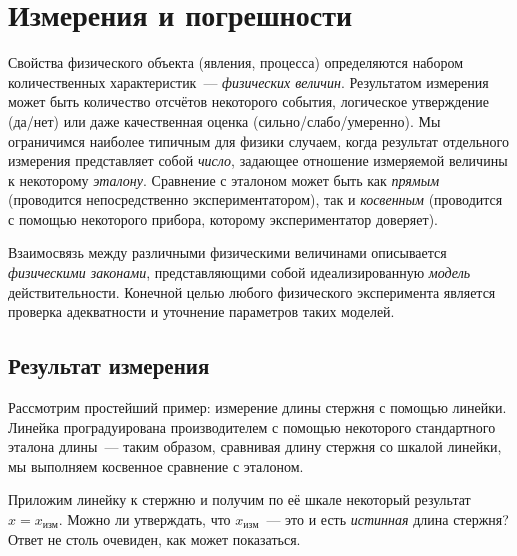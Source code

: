 \chapter{Измерения и погрешности}


Свойства физического объекта (явления, процесса) определяются набором
количественных характеристик~--- \emph{физических величин}.
Результатом измерения может быть количество отсчётов некоторого события, логическое утверждение (да/нет) или даже качественная оценка (сильно/слабо/умеренно). 
Мы ограничимся наиболее типичным для физики случаем, когда результат отдельного измерения представляет собой \emph{число}, задающее отношение измеряемой величины к некоторому \emph{эталону}.
Сравнение с эталоном может быть как \emph{прямым} (проводится непосредственно экспериментатором), так и \emph{косвенным} (проводится с помощью некоторого прибора, которому экспериментатор доверяет).

Взаимосвязь между различными физическими величинами описывается
\emph{физическими законами}, представляющими собой идеализированную
\emph{модель} действительности. Конечной целью любого физического
эксперимента является проверка адекватности и
уточнение параметров таких моделей.

\section{Результат измерения}

Рассмотрим простейший пример: измерение длины стержня
с помощью линейки. Линейка проградуирована производителем с помощью
некоторого стандартного эталона длины~--- таким образом, сравнивая длину
стержня со шкалой линейки, мы выполняем косвенное сравнение с
эталоном.


Приложим линейку к стержню и получим по её шкале некоторый результат~$x=x_{изм}$. Можно ли утверждать, что $x_{изм}$~--- это и есть \emph{истинная} длина стержня? Ответ не столь очевиден, как может показаться.

